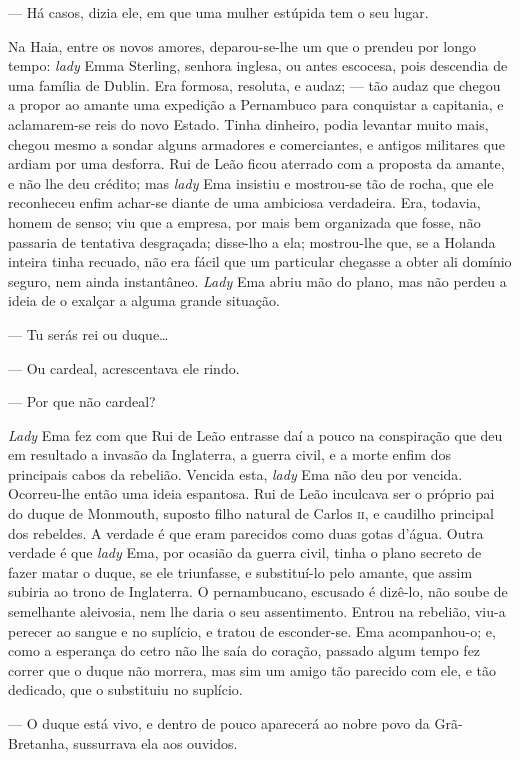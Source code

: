 --- Há casos, dizia ele, em que uma mulher estúpida tem o seu lugar.

Na Haia, entre os novos amores, deparou-se-lhe um que o prendeu por
longo tempo: \emph{lady} Emma Sterling, senhora inglesa, ou antes
escocesa, pois descendia de uma família de Dublin. Era formosa,
resoluta, e audaz; --- tão audaz que chegou a propor ao amante uma
expedição a Pernambuco para conquistar a capitania, e aclamarem-se reis
do novo Estado. Tinha dinheiro, podia levantar muito mais, chegou mesmo
a sondar alguns armadores e comerciantes, e antigos militares que ardiam
por uma desforra. Rui de Leão ficou aterrado com a proposta da amante, e
não lhe deu crédito; mas \emph{lady} Ema insistiu e mostrou-se tão de
rocha, que ele reconheceu enfim achar-se diante de uma ambiciosa
verdadeira. Era, todavia, homem de senso; viu que a empresa, por mais
bem organizada que fosse, não passaria de tentativa desgraçada;
disse-lho a ela; mostrou-lhe que, se a Holanda inteira tinha recuado,
não era fácil que um particular chegasse a obter ali domínio seguro, nem
ainda instantâneo. \emph{Lady} Ema abriu mão do plano, mas não perdeu a
ideia de o exalçar a alguma grande situação.

--- Tu serás rei ou duque\ldots{}

--- Ou cardeal, acrescentava ele rindo.

--- Por que não cardeal?

\emph{Lady} Ema fez com que Rui de Leão entrasse daí a pouco na
conspiração que deu em resultado a invasão da Inglaterra, a guerra
civil, e a morte enfim dos principais cabos da rebelião. Vencida esta,
\emph{lady} Ema não deu por vencida. Ocorreu-lhe então uma ideia
espantosa. Rui de Leão inculcava ser o próprio pai do duque de Monmouth,
suposto filho natural de Carlos \textsc{ii}, e caudilho principal dos rebeldes. A
verdade é que eram parecidos como duas gotas d'água. Outra verdade é que
\emph{lady} Ema, por ocasião da guerra civil, tinha o plano secreto de
fazer matar o duque, se ele triunfasse, e substituí-lo pelo amante, que
assim subiria ao trono de Inglaterra. O pernambucano, escusado é
dizê-lo, não soube de semelhante aleivosia, nem lhe daria o seu
assentimento. Entrou na rebelião, viu-a perecer ao sangue e no suplício,
e tratou de esconder-se. Ema acompanhou-o; e, como a esperança do cetro
não lhe saía do coração, passado algum tempo fez correr que o duque não
morrera, mas sim um amigo tão parecido com ele, e tão dedicado, que o
substituiu no suplício.

--- O duque está vivo, e dentro de pouco aparecerá ao nobre povo da
Grã-Bretanha, sussurrava ela aos ouvidos.

